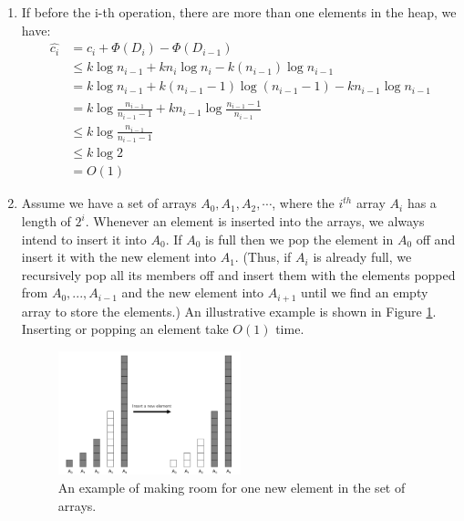 \documentclass[12pt,a4paper]{article}
\makeatletter
\newtheorem*{solution}{Solution}
\theoremstyle{definition}
\renewenvironment{solution}[1][Solution] {\par\pushQED{\qed}\normalfont\topsep6\p@\@plus6\p@\relax\trivlist\item[\hskip\labelsep\bfseries#1\@addpunct{.}]\ignorespaces}{\popQED\endtrivlist\@endpefalse} \makeatother
\makeatother
\begin{document}
\begin{enumerate}
\begin{solution}
	If before the i-th operation, there are more than one elements in the heap,  we have:
	\begin{align*}
	\hat{c_i} &= c_i + \Phi(D_i) - \Phi(D_{i-1})\\
	&\leqslant k\log n_{i-1} + kn_i\log n_i - k(n_{i-1})\log n_{i-1}\\
	&= k\log n_{i-1}  + k (n_{i-1} - 1)\log (n_{i-1} - 1) - kn_{i-1}\log n_{i-1}\\
	&= k\log \frac{n_{i-1}}{n_{i-1}-1}+kn_{i-1}\log \frac{n_{i-1}-1}{n_{i-1}}\\
	&\leqslant 	k\log \frac{n_{i-1}}{n_{i-1}-1}\\
	&\leqslant k\log2\\
	&=O(1)
	\end{align*}
	\end{solution}
	\item Assume we have a set of arrays $A_0, A_1, A_2,\cdots$, where the $i^{th}$ array $A_i$ has a length of $2^i$. Whenever an element is inserted into the arrays, we always intend to insert it into $A_0$. If $A_0$ is full then we pop the element in $A_0$ off and insert it with the new element into $A_{1}$. (Thus, if $A_{i}$ is already full, we recursively pop all its members off and insert them with the elements popped from $A_0,...,A_{i-1}$ and the new element into $A_{i+1}$ until we find an empty array to store the elements.) An illustrative example is shown in Figure \ref{Fig-MultiArray}. Inserting or popping an element take $O(1)$ time.

	\begin{figure}[!htbp]
	\centering
	\includegraphics[width=0.5\textwidth]{Fig-MultiArray.pdf}
	\caption{An example of making room for one new element in the set of arrays.}
	\label{Fig-MultiArray}
	\end{figure}


\end{enumerate}
\end{document}
